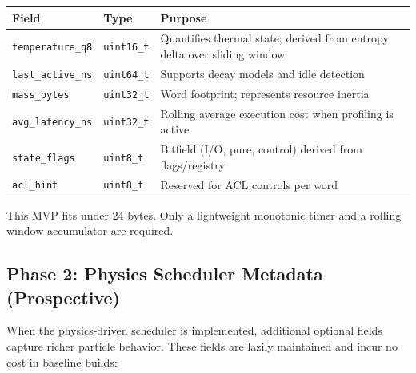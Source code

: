 \begin{center}
\begin{tabular}{llp{6.5cm}}
\toprule
Field & Type & Purpose \\
\midrule
\texttt{temperature\_q8}  & \texttt{uint16\_t} & Quantifies thermal state; derived from entropy delta over sliding window \\
\texttt{last\_active\_ns} & \texttt{uint64\_t} & Supports decay models and idle detection \\
\texttt{mass\_bytes}      & \texttt{uint32\_t} & Word footprint; represents resource inertia \\
\texttt{avg\_latency\_ns} & \texttt{uint32\_t} & Rolling average execution cost when profiling is active \\
\texttt{state\_flags}     & \texttt{uint8\_t}  & Bitfield (I/O, pure, control) derived from flags/registry \\
\texttt{acl\_hint}        & \texttt{uint8\_t}  & Reserved for ACL controls per word \\
\bottomrule
\end{tabular}
\end{center}

This MVP fits under 24 bytes. Only a lightweight monotonic timer and a
rolling window accumulator are required.

\subsection{Phase 2: Physics Scheduler Metadata (Prospective)}

When the physics-driven scheduler is implemented, additional optional
fields capture richer particle behavior. These fields are lazily maintained
and incur no cost in baseline builds:

